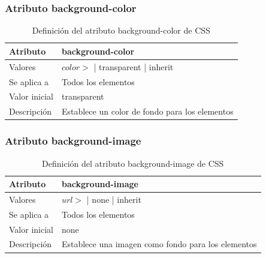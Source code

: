 \documentclass[ucs]{beamer}
\begin{document}
\begin{frame}
\frametitle{Atributo background-color}

\begin{center}
  \begin{table}
   \begin{tabular}{p{1.8cm}p{7.8cm}}
Atributo & \bf{background-color} \\ \hline
Valores& $color>$ | transparent | inherit \\ \hline
Se aplica a& Todos los elementos \\ \hline
Valor inicial& transparent \\ \hline
Descripción& Establece un color de fondo para los elementos \\ \hline
  \end{tabular}
   \caption{Definición del atributo background-color de CSS}
 \end{table}
\end{center}


\end{frame}



\begin{frame}
\frametitle{Atributo background-image}

\begin{center}
  \begin{table}
   \begin{tabular}{p{1.8cm}p{7.8cm}}
Atributo & \bf{background-image} \\ \hline
Valores& $url>$ | none | inherit \\ \hline
Se aplica a& Todos los elementos \\ \hline
Valor inicial& none \\ \hline
Descripción& Establece una imagen como fondo para los elementos \\ \hline
  \end{tabular}
   \caption{Definición del atributo background-image de CSS}
 \end{table}
\end{center}


\end{frame}


\end{document}
